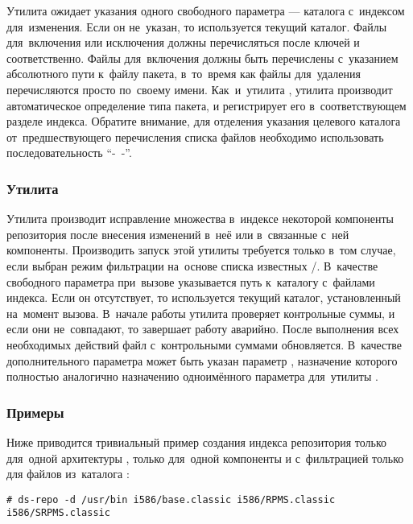 Утилита  ожидает указания одного свободного параметра --- каталога с~индексом для~изменения.
Если он не~указан, то используется текущий каталог.
Файлы для~включения или исключения должны перечисляться после ключей  и  соответственно.
Файлы для~включения должны быть  перечислены с~указанием абсолютного пути к~файлу пакета, 
в~то~время как файлы для~удаления перечисляются просто по~своему имени.
Как~и~утилита , утилита  производит автоматическое определение типа пакета,
и регистрирует его в~соответствующем разделе индекса.
Обратите внимание, для отделения указания целевого каталога от~предшествующего перечисления  списка файлов необходимо использовать последовательность ``-~-''.

\subsubsection{Утилита }

Утилита  производит исправление множества \provides в~индексе некоторой компоненты репозитория после внесения изменений в~неё 
или в~связанные с~ней компоненты.
Производить запуск этой утилиты требуется только в~том случае, если выбран режим фильтрации \provides на~основе списка известных \requires/\conflicts.
В~качестве свободного параметра при~вызове указывается  путь к~каталогу с~файлами индекса.
Если он отсутствует, то используется текущий каталог, установленный на~момент вызова.
В~начале работы утилита  проверяет   контрольные суммы, и если они не~совпадают, то завершает работу аварийно.
После выполнения всех необходимых действий файл с~контрольными суммами обновляется.
В~качестве дополнительного параметра может быть указан параметр , 
назначение которого полностью аналогично назначению одноимённого параметра для~утилиты .

\subsubsection{Примеры}

Ниже приводится тривиальный пример создания индекса репозитория только для~одной архитектуры , только для~одной компоненты 
и с~фильтрацией \provides только для файлов из~каталога :

{\large
\begin{verbatim}
# ds-repo -d /usr/bin i586/base.classic i586/RPMS.classic i586/SRPMS.classic
\end{verbatim}
}

